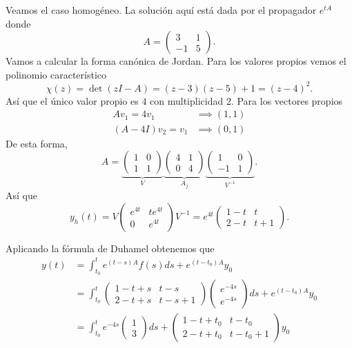 Veamos el caso homogéneo. La solución aquí está dada por el propagador
\(e^{tA}\) donde
\[
    A =
    \begin{pmatrix}
    3 & 1\\
    -1 & 5
    \end{pmatrix}
.\]
Vamos a calcular la forma canónica de Jordan. Para los valores propios vemos el
polinomio característico
\[
    \chi(z)
    =
    \det(zI - A)
    =
    (z-3)(z-5) + 1
    =
    (z-4)^2
.\]
Así que el único valor propio es \(4\) con multiplicidad 2. Para los vectores
propios
\begin{align*}
    Av_1 = 4v_1 &\implies (1,1)\\
    (A-4I)v_2 = v_1 &\implies (0,1)
\end{align*}
De esta forma,
\[
    A
    =
    \underbrace{\begin{pmatrix} 1 & 0\\ 1 & 1 \end{pmatrix}}_{V}
    \underbrace{\begin{pmatrix} 4 & 1\\ 0 & 4 \end{pmatrix}}_{A_j}
    \underbrace{\begin{pmatrix} 1 & 0\\-1 & 1 \end{pmatrix}}_{V^{-1}}
.\]
Así que
\[
    y_h(t) =
    V
    \begin{pmatrix} e^{4t} & t e^{4t}\\ 0 & e^{4t} \end{pmatrix}
    V^{-1}
    =
    e^{4t} \begin{pmatrix} 1-t & t \\ 2-t & t+1 \end{pmatrix}
.\]

Aplicando la fórmula de Duhamel obtenemos que
\begin{align*}
    y(t)
    &=
    \int_{t_0}^{t} e^{(t-s)A} f(s) ds + e^{(t-t_0)A} y_0
    \\&=
    \int_{t_0}^{t}
    \begin{pmatrix} 1-t+s & t-s\\ 2-t+s & t-s+1\end{pmatrix}
    \begin{pmatrix} e^{-4s} \\ e^{-4s} \end{pmatrix}
    ds
    +
    e^{(t-t_0)A}y_0
    \\&=
    \int_{t_0}^{t} e^{-4s} \begin{pmatrix} 1\\ 3 \end{pmatrix}ds
    +
    \begin{pmatrix}
    1-t+t_0 & t-t_0\\
    2-t+t_0 & t-t_0+1
    \end{pmatrix}
    y_0
\end{align*}


